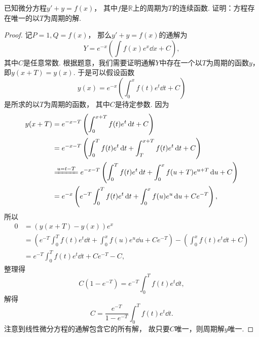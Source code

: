 \begin{example}
已知微分方程\(y' + y = f(x)\)，
其中\(f\)是\(\mathbb{R}\)上的周期为\(T\)的连续函数.
证明：方程存在唯一的以\(T\)为周期的解.
\begin{proof}
记\(P = 1,
Q = f(x)\)，
那么\(y' + y = f(x)\)的通解为\begin{equation*}
	Y = e^{-x} \left( \int f(x) e^x \dd{x} + C \right),
\end{equation*}
其中\(C\)是任意常数.
根据题意，我们需要证明通解\(Y\)中存在一个以\(T\)为周期的函数\(y\)，即\(y(x+T) = y(x)\).
于是可以假设函数\begin{equation*}
	y(x) = e^{-x} \left( \int_0^x f(t) e^t \dd{t} + C \right)
\end{equation*}是所求的以\(T\)为周期的函数，
其中\(C\)是待定参数.
因为\begin{align*}
	y(x+T) &= e^{-x-T} \left( \int_0^{x+T} f(t) e^t \dd{t} + C \right) \\
	&= e^{-x-T} \left( \int_0^T f(t) e^t \dd{t} + \int_T^{x+T} f(t) e^t \dd{t} + C \right) \\
	&\xlongequal{u=t-T}
	e^{-x-T} \left( \int_0^T f(t) e^t \dd{t} + \int_0^x f(u+T) e^{u+T} \dd{u} + C \right) \\
	&= e^{-x} \left( e^{-T} \int_0^T f(t) e^t \dd{t} + \int_0^x f(u) e^u \dd{u} + C e^{-T} \right),
\end{align*}
所以\begin{align*}
	0 &= (y(x+T) - y(x)) e^x \\
	&= \left( e^{-T} \int_0^T f(t) e^t \dd{t} + \int_0^x f(u) e^u \dd{u} + C e^{-T} \right)
	- \left( \int_0^x f(t) e^t \dd{t} + C \right) \\
	&= e^{-T} \int_0^T f(t) e^t \dd{t} + C e^{-T} - C,
\end{align*}
整理得\begin{equation*}
	C (1 - e^{-T}) = e^{-T} \int_0^T f(t) e^t \dd{t},
\end{equation*}
解得\begin{equation*}
	C = \frac{e^{-T}}{1 - e^{-T}} \int_0^T f(t) e^t \dd{t}.
\end{equation*}
注意到线性微分方程的通解包含它的所有解，
故只要\(C\)唯一，则周期解\(y\)唯一.
\end{proof}
\end{example}


